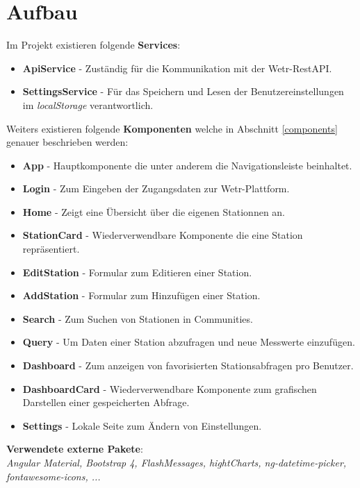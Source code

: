 \documentclass[12pt, letterpaper]{article}
\begin{document}
\section{Aufbau}

Im Projekt existieren folgende \textbf{Services}:
\begin{itemize}
    \item \textbf{ApiService} - Zuständig für die Kommunikation mit der Wetr-RestAPI.
    \item \textbf{SettingsService} - Für das Speichern und Lesen der Benutzereinstellungen im \textit{localStorage} verantwortlich.
\end{itemize}

Weiters existieren folgende \textbf{Komponenten} welche in Abschnitt \ref{components} genauer beschrieben werden:
\begin{itemize}
    \item \textbf{App} - Hauptkomponente die unter anderem die Navigationsleiste beinhaltet.
    \item \textbf{Login} - Zum Eingeben der Zugangsdaten zur Wetr-Plattform.
    \item \textbf{Home} - Zeigt eine Übersicht über die eigenen Stationnen an.
    \item \textbf{StationCard} - Wiederverwendbare Komponente die eine Station repräsentiert.
    \item \textbf{EditStation} - Formular zum Editieren einer Station.
    \item \textbf{AddStation} - Formular zum Hinzufügen einer Station.
    \item \textbf{Search} - Zum Suchen von Stationen in Communities.
    \item \textbf{Query} - Um Daten einer Station abzufragen und neue Messwerte einzufügen.
    \item \textbf{Dashboard} - Zum anzeigen von favorisierten Stationsabfragen pro Benutzer.
    \item \textbf{DashboardCard} - Wiederverwendbare Komponente zum grafischen Darstellen einer gespeicherten Abfrage.
    \item \textbf{Settings} - Lokale Seite zum Ändern von Einstellungen.

\end{itemize}

\textbf{Verwendete externe Pakete}:\\
\textit{Angular Material, Bootstrap 4, FlashMessages, hightCharts, ng-datetime-picker, fontawesome-icons, ...}
\end{document}
